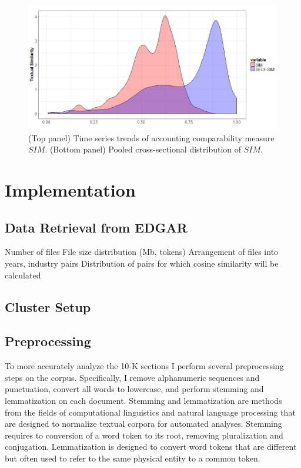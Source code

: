 \documentclass{article}
\begin{document}
\begin{figure}[ht]
\vskip 0.2in
\begin{center}
\centerline{\includegraphics[width=\columnwidth]{figures/cossim-dist}}
\caption{(Top panel) Time series trends of accounting comparability measure $SIM$. (Bottom panel) Pooled cross-sectional distribution of $SIM$.}
\label{cossim-figures}
\end{center}
\vskip -0.2in
\end{figure} 

\section{Implementation}\label{implementation}
\subsection{Data Retrieval from EDGAR}
Number of files
File size distribution (Mb, tokens)
Arrangement of files into years, industry pairs
Distribution of pairs for which cosine similarity will be calculated
\subsection{Cluster Setup}
\subsection{Preprocessing}\label{ssec:preprocess}
To more accurately analyze the 10-K sections I perform several preprocessing steps on the corpus. Specifically, I remove alphanumeric sequences and punctuation, convert all words to lowercase, and perform stemming and lemmatization on each document.
Stemming and lemmatization are methods from the fields of computational linguistics and natural language processing that are designed to normalize textual corpora for automated analyses. Stemming requires to conversion of a word token to its root, removing pluralization and conjugation. Lemmatization is designed to convert word tokens that are different but often used to refer to the same physical entity to a common token. 
\end{document}
